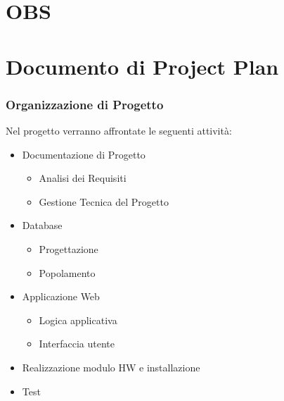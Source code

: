 \documentclass[a4paper,12pt]{beamer}
\begin{document}
\pagebreak

\section{OBS}
\begin{frame}

\end{frame}

\begin{frame}

\end{frame}

\pagebreak

\section{Documento di Project Plan}
\begin{frame}
\frametitle{Organizzazione di Progetto}
Nel progetto verranno affrontate le seguenti attività:
\begin{itemize}
\item Documentazione di Progetto
\begin{itemize}
\item Analisi dei Requisiti
\item Gestione Tecnica del Progetto
\end{itemize}
\item Database
\begin{itemize}
\item Progettazione 
\item Popolamento
\end{itemize}
\item Applicazione Web
\begin{itemize}
\item Logica applicativa
\item Interfaccia utente
\end{itemize}
\item Realizzazione modulo HW e installazione
\item Test
\end{itemize}
\end{frame}

\pagebreak
\end{document}
